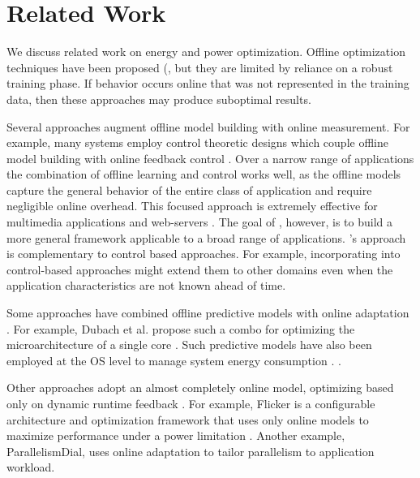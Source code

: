 \section{Related Work}
\label{sec:related}
\balance
We discuss related work on energy and power optimization. Offline optimization techniques have been proposed (\eg \cite{Yi2003,LeeBrooks2006,CPR,ChenJohn2011,petabricksStatic}, but
they are limited by reliance on a robust training phase.  If behavior
occurs online that was not represented in the training data, then
these approaches may produce suboptimal results.

Several approaches augment offline model building with online
measurement.  For example, many systems employ control theoretic
designs which couple offline model building with online feedback
control
\cite{Wu2004,TCST,Chen2011,PTRADE,Heartbeats2,ControlWare,Agilos,Rajkumar,Sojka,Raghavendra2008}.
Over a narrow range of applications the combination of offline
learning and control works well, as the offline models capture the
general behavior of the entire class of application and require
negligible online overhead.  This focused approach is extremely
effective for multimedia applications
\cite{grace2,flinn99,flinn2004,xtune,TCST} and web-servers
\cite{Horvarth,LuEtAl-2006a,SunDaiPan-2008a}.  The goal of \SYSTEM{},
however, is to build a more general framework applicable to a broad
range of applications.  \SYSTEM{}'s approach is complementary to
control based approaches.  For example, incorporating \SYSTEM{} into
control-based approaches might extend them to other domains even when
the application characteristics are not known ahead of time.

Some approaches have combined offline predictive models with online
adaptation
\cite{Zhang2012,packandcap,Winter2010,dubach2010,Koala,Cinder, wu2012inferred}.  For
example, Dubach et al.  propose such a combo for optimizing the
microarchitecture of a single core \cite{dubach2010}.  Such predictive
models have also been employed at the OS level to manage system energy
consumption \cite{Koala,Cinder}. \cite{wu2012inferred}. 

Other approaches adopt an almost completely online model, optimizing
based only on dynamic runtime feedback
\cite{Li2006,Flicker,ParallelismDial,Ponamarev,petabricksDynamic,LeeBrooks}.
For example, Flicker is a configurable architecture and optimization
framework that uses only online models to maximize performance under a
power limitation \cite{Flicker}.  Another example, ParallelismDial,
uses online adaptation to tailor parallelism to application workload.


